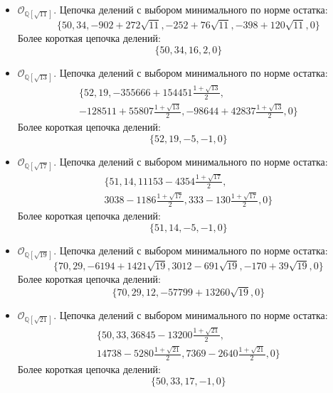 \documentclass[_00_dissertation.tex]{subfiles}
\begin{document}
\begin{itemize}
    \item $\mathcal{O}_{\mathbb{Q}[\sqrt{11}]}$.
    Цепочка делений с выбором минимального по норме остатка:
    \begin{equation*}
        \{50, 34, -902+272\sqrt{11}, -252+76\sqrt{11}, -398+120\sqrt{11}, 0\}
    \end{equation*}
    Более короткая цепочка делений:
    \begin{equation*}
        \{50, 34, 16, 2, 0\}
    \end{equation*}

    \item $\mathcal{O}_{\mathbb{Q}[\sqrt{13}]}$.
    Цепочка делений с выбором минимального по норме остатка:
    \begin{multline*}
        \{52, 19, -355666+154451\frac{1+\sqrt{13}}{2},\\
        -128511+55807\frac{1+\sqrt{13}}{2}, -98644+42837\frac{1+\sqrt{13}}{2}, 0\}
    \end{multline*}
    Более короткая цепочка делений:
    \begin{equation*}
        \{52, 19, -5, -1, 0\}
    \end{equation*}

    \item $\mathcal{O}_{\mathbb{Q}[\sqrt{17}]}$.
    Цепочка делений с выбором минимального по норме остатка:
    \begin{multline*}
        \{51, 14, 11153-4354\frac{1+\sqrt{17}}{2},\\
        3038-1186\frac{1+\sqrt{17}}{2}, 333-130\frac{1+\sqrt{17}}{2}, 0\}
    \end{multline*}
    Более короткая цепочка делений:
    \begin{equation*}
        \{51, 14, -5, -1, 0\}
    \end{equation*}

    \item $\mathcal{O}_{\mathbb{Q}[\sqrt{19}]}$.
    Цепочка делений с выбором минимального по норме остатка:
    \begin{equation*}
        \{70, 29, -6194+1421\sqrt{19}, 3012-691\sqrt{19}, -170+39\sqrt{19}, 0\}
    \end{equation*}
    Более короткая цепочка делений:
    \begin{equation*}
        \{70, 29, 12, -57799+13260\sqrt{19}, 0\}
    \end{equation*}

    \item $\mathcal{O}_{\mathbb{Q}[\sqrt{21}]}$.
    Цепочка делений с выбором минимального по норме остатка:
    \begin{multline*}
      \{50, 33, 36845-13200\frac{1+\sqrt{21}}{2},\\
      14738-5280\frac{1+\sqrt{21}}{2}, 7369-2640\frac{1+\sqrt{21}}{2}, 0\}
    \end{multline*}
    Более короткая цепочка делений:
    \begin{equation*}
        \{50, 33, 17, -1, 0\}
    \end{equation*}


\end{itemize}
\end{document}
